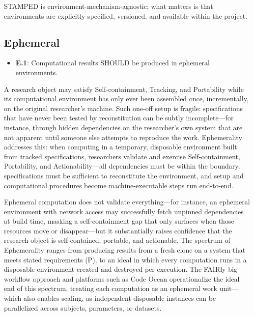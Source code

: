 \documentclass{article}
\begin{document}
STAMPED is environment-mechanism-agnostic; what matters is that
environments are explicitly specified, versioned, and available within the project.




\subsection{Ephemeral}

\begin{itemize}
    \item \textbf{E.1}: Computational results SHOULD be produced in ephemeral environments.
\end{itemize}

A research object may satisfy Self-containment, Tracking, and Portability while its computational environment has only ever been assembled once, incrementally, on the original researcher's machine.
Such one-off setup is fragile: specifications that have never been tested by reconstitution can be subtly incomplete---for instance, through hidden dependencies on the researcher's own system that are not apparent until someone else attempts to reproduce the work.
Ephemerality addresses this: when computing in a temporary, disposable environment built from tracked specifications, researchers validate and exercise Self-containment, Portability, and Actionability---all dependencies must be within the boundary, specifications must be sufficient to reconstitute the environment, and setup and computational procedures become machine-executable steps run end-to-end.

Ephemeral computation does not validate everything---for instance, an ephemeral environment with network access may successfully fetch unpinned dependencies at build time, masking a self-containment gap that only surfaces when those resources move or disappear---but it substantially raises confidence that the research object is self-contained, portable, and actionable.
The spectrum of Ephemerality ranges from producing results from a fresh clone on a system that meets stated requirements (P), to an ideal in which every computation runs in a disposable environment created and destroyed per execution.
The FAIRly big workflow approach\cite{hanke_defense_2021} and platforms such as Code Ocean operationalize the ideal end of this spectrum, treating each computation as an ephemeral work unit---which also enables scaling, as independent disposable instances can be parallelized across subjects, parameters, or datasets.
\end{document}
